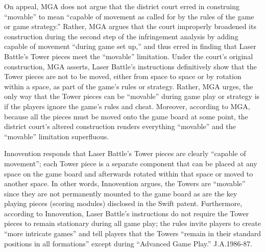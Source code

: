 On appeal, MGA does not argue that the district court erred in construing
``movable'' to mean ``capable of movement as called for by the rules of the
game or game strategy.'' Rather, MGA argues that the court improperly broadened
its construction during the second step of the infringement analysis by adding
capable of movement ``during game set up,'' and thus erred in finding that
Laser Battle's Tower pieces meet the ``movable'' limitation. Under the court's
original construction, MGA asserts, Laser Battle's instructions definitively
show that the Tower pieces are not to be moved, either from space to space or
by rotation within a space, as part of the game's rules or strategy. Rather,
MGA urges, the only way that the Tower pieces can be ``movable'' during game
play or strategy is if the players ignore the game's rules and cheat. Moreover,
according to MGA, because all the pieces must be moved onto the game board at
some point, the district court's altered construction renders everything
``movable'' and the ``movable'' limitation superfluous.

Innovention responds that Laser Battle's Tower pieces are clearly ``capable of
movement''; each Tower piece is a separate component that can be placed at any
space on the game board and afterwards rotated within that space or moved to
another space. In other words, Innovention argues, the Towers are ``movable''
since they are not permanently mounted to the game board as are the key playing
pieces (scoring modules) disclosed in the Swift patent. Furthermore, according
to Innovention, Laser Battle's instructions do not require the Tower pieces to
remain stationary during all game play; the rules invite players to create
``more intricate games'' and tell players that the Towers ``remain in their
standard positions in all formations'' except during ``Advanced Game Play.''
J.A.1986-87.

